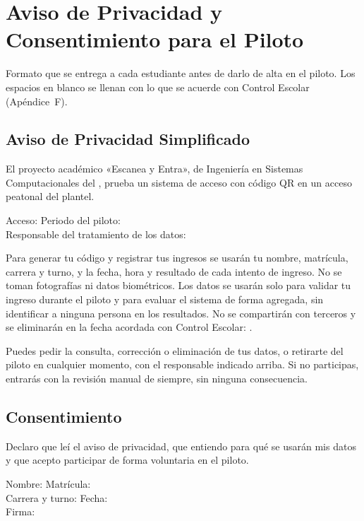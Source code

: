 \section{Aviso de Privacidad y Consentimiento para el Piloto}
Formato que se entrega a cada estudiante antes de darlo de alta en el
piloto. Los espacios en blanco se llenan con lo que se acuerde con Control
Escolar (Apéndice~F).

\subsection{Aviso de Privacidad Simplificado}
El proyecto académico «Escanea y Entra», de Ingeniería en Sistemas
Computacionales del \tescha{}, prueba un sistema de acceso con código QR en un
acceso peatonal del plantel.

\medskip
\noindent Acceso: \linea[4cm] \quad Periodo del piloto: \linea[5cm]\\[0.5em]
Responsable del tratamiento de los datos: \linea[7cm]

\medskip

Para generar tu código y registrar tus ingresos se usarán tu nombre,
matrícula, carrera y turno, y la fecha, hora y resultado de cada intento de
ingreso. No se toman fotografías ni datos biométricos. Los datos se usarán
solo para validar tu ingreso durante el piloto y para evaluar el sistema de
forma agregada, sin identificar a ninguna persona en los resultados. No se
compartirán con terceros y se eliminarán en la fecha acordada con Control Escolar: \linea[3cm].

Puedes pedir la consulta, corrección o eliminación de tus datos, o retirarte
del piloto en cualquier momento, con el responsable indicado arriba. Si no participas, entrarás
con la revisión manual de siempre, sin ninguna consecuencia.

\subsection{Consentimiento}
\noindent Declaro que leí el aviso de privacidad, que entiendo para qué se
usarán mis datos y que acepto participar de forma voluntaria en el piloto.

\bigskip
\noindent Nombre: \linea[7cm] \quad Matrícula: \linea[3cm]\\[1.2em]
Carrera y turno: \linea[6cm] \quad Fecha: \linea[3cm]\\[1.2em]
Firma: \linea[5cm]
